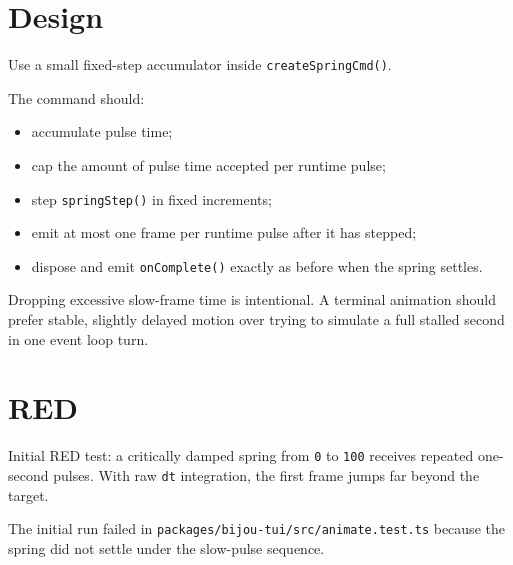 \section{Design}\label{record-161-design}

Use a small fixed-step accumulator inside \texttt{c\allowbreak{}r\allowbreak{}e\allowbreak{}a\allowbreak{}t\allowbreak{}e\allowbreak{}S\allowbreak{}p\allowbreak{}r\allowbreak{}i\allowbreak{}n\allowbreak{}g\allowbreak{}C\allowbreak{}m\allowbreak{}d\allowbreak{}(\allowbreak{})}.

The command should:

\begin{itemize}
\tightlist
\item
  accumulate pulse time;
\item
  cap the amount of pulse time accepted per runtime pulse;
\item
  step \texttt{s\allowbreak{}p\allowbreak{}r\allowbreak{}i\allowbreak{}n\allowbreak{}g\allowbreak{}S\allowbreak{}t\allowbreak{}e\allowbreak{}p\allowbreak{}(\allowbreak{})} in fixed increments;
\item
  emit at most one frame per runtime pulse after it has stepped;
\item
  dispose and emit \texttt{o\allowbreak{}n\allowbreak{}C\allowbreak{}o\allowbreak{}m\allowbreak{}p\allowbreak{}l\allowbreak{}e\allowbreak{}t\allowbreak{}e\allowbreak{}(\allowbreak{})} exactly as before when the spring settles.
\end{itemize}

Dropping excessive slow-frame time is intentional. A terminal animation should prefer stable, slightly delayed motion over trying to simulate a full stalled second in one event loop turn.

\section{RED}\label{record-161-red}

Initial RED test: a critically damped spring from \texttt{0} to \texttt{1\allowbreak{}0\allowbreak{}0} receives repeated one-second pulses. With raw \texttt{d\allowbreak{}t} integration, the first frame jumps far beyond the target.

The initial run failed in \texttt{p\allowbreak{}a\allowbreak{}c\allowbreak{}k\allowbreak{}a\allowbreak{}g\allowbreak{}e\allowbreak{}s\allowbreak{}/\allowbreak{}b\allowbreak{}i\allowbreak{}j\allowbreak{}o\allowbreak{}u\allowbreak{}-\allowbreak{}t\allowbreak{}u\allowbreak{}i\allowbreak{}/\allowbreak{}s\allowbreak{}r\allowbreak{}c\allowbreak{}/\allowbreak{}a\allowbreak{}n\allowbreak{}i\allowbreak{}m\allowbreak{}a\allowbreak{}t\allowbreak{}e\allowbreak{}.\allowbreak{}t\allowbreak{}e\allowbreak{}s\allowbreak{}t\allowbreak{}.\allowbreak{}t\allowbreak{}s} because the spring did not settle under the slow-pulse sequence.

